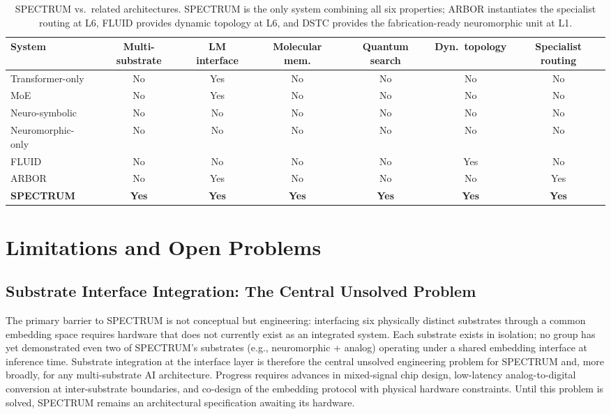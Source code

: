 \documentclass[12pt]{article}
\begin{document}
\begin{table}[H]
\centering
\small
\begin{tabular}{lcccccc}
\toprule
\textbf{System} & \textbf{Multi-substrate} & \textbf{LM interface} & \textbf{Molecular mem.} & \textbf{Quantum search} & \textbf{Dyn.\ topology} & \textbf{Specialist routing} \\
\midrule
Transformer-only    & No  & Yes & No  & No  & No  & No \\
MoE \cite{shazeer2017} & No & Yes & No & No  & No  & No \\
Neuro-symbolic \cite{garnelo2019} & No & No & No & No & No & No \\
Neuromorphic-only \cite{davies2021} & No & No & No & No & No & No \\
FLUID \cite{lin2026fluid}   & No  & No  & No  & No  & Yes & No \\
ARBOR \cite{lin2026arbor}   & No  & Yes & No  & No  & No  & Yes \\
\textbf{SPECTRUM}   & \textbf{Yes} & \textbf{Yes} & \textbf{Yes} & \textbf{Yes} & \textbf{Yes} & \textbf{Yes} \\
\bottomrule
\end{tabular}
\caption{SPECTRUM vs.\ related architectures. SPECTRUM is the only system combining all six properties; ARBOR instantiates the specialist routing at L6, FLUID provides dynamic topology at L6, and DSTC provides the fabrication-ready neuromorphic unit at L1.}
\label{tab:related}
\end{table}

\section{Limitations and Open Problems}
\label{sec:limitations}

\subsection*{Substrate Interface Integration: The Central Unsolved Problem}

The primary barrier to SPECTRUM is not conceptual but engineering: interfacing six physically distinct substrates through a common embedding space requires hardware that does not currently exist as an integrated system. Each substrate exists in isolation; no group has yet demonstrated even two of SPECTRUM's substrates (e.g., neuromorphic + analog) operating under a shared embedding interface at inference time. Substrate integration at the interface layer is therefore the central unsolved engineering problem for SPECTRUM and, more broadly, for any multi-substrate AI architecture. Progress requires advances in mixed-signal chip design, low-latency analog-to-digital conversion at inter-substrate boundaries, and co-design of the embedding protocol with physical hardware constraints. Until this problem is solved, SPECTRUM remains an architectural specification awaiting its hardware.
\end{document}
